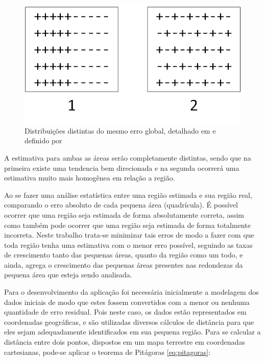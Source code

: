 \begin{figure}[h]
	\centering	
	\includegraphics[scale=2]{Figuras/Ilustration-ErrorDistArango.png}
	\caption{Distribuições distintas do mesmo erro global, detalhado em \cite{arango2000thesis} e definido por \cite{willis1995spatial}}
	\label{fig:ErrorDistArango}
\end{figure}

A estimativa para ambas as áreas serão completamente distintas, sendo que na primeira existe uma tendencia bem direcionada e na segunda ocorrerá uma estimativa muito mais homogênea em relação a região. 

Ao se fazer uma análise estatística entre uma região estimada e sua região real, comparando o erro absoluto de cada pequena área (quadrícula). É possível ocorrer que uma região seja estimada de forma absolutamente correta, assim como também pode ocorrer que uma região seja estimada de forma totalmente incorreta. Neste trabalho trata-se minimizar tais erros de modo a fazer com que toda região tenha uma estimativa com o menor erro possível, seguindo as taxas de crescimento tanto das pequenas áreas, quanto da região como um todo, e ainda, agrega o crescimento das pequenas áreas presentes nas redondezas da pequena área que esteja sendo analisada.

Para o desenvolvimento da aplicação foi necessária inicialmente a modelagem dos dados iniciais de modo que estes fossem convertidos com a menor ou nenhuma quantidade de erro residual. Pois neste caso, os dados estão representados em coordenadas geográficas, e são utilizadas diversos cálculos de distância para que eles sejam adequadamente identificados em sua pequena região. Para se calcular a distância entre dois pontos, dispostos em um mapa terrestre em coordenadas cartesianas, pode-se aplicar o teorema de Pitágoras \ref{eq:pitagoras}:

